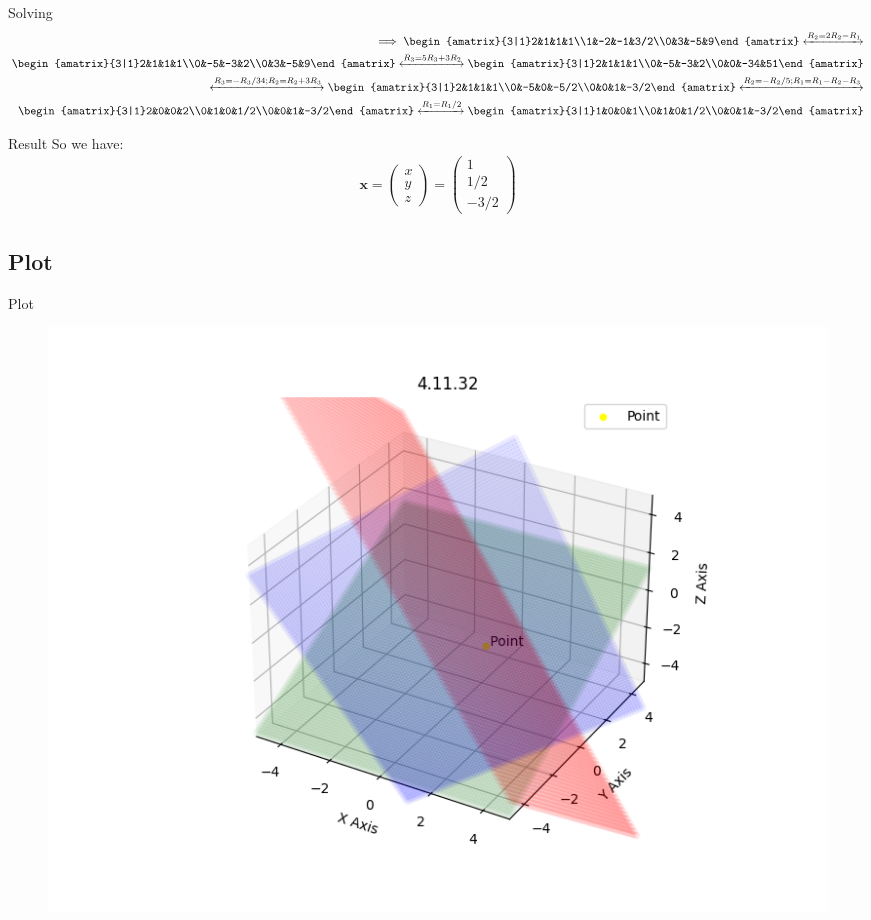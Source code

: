 \documentclass{beamer}
\theoremstyle{remark}
\newcommand{\myvec}[1]{\ensuremath{\begin{pmatrix}#1\end{pmatrix}}}
\newcommand{\augvec}[3]{\ensuremath{\begin{amatrix}{#1|#2}#3\end{amatrix}}}
\let\vec\mathbf
\numberwithin{equation}{section}
\begin{document}
\begin{frame}{Solving}
\begin{align}
 \implies \augvec{3}{1}{2&1&1&1\\1&-2&-1&3/2\\0&3&-5&9} \xleftrightarrow[]{R_2=2R_2-R_1} \\
 \augvec{3}{1}{2&1&1&1\\0&-5&-3&2\\0&3&-5&9} \xleftrightarrow[]{R_3=5R_3+3R_2}
 \augvec{3}{1}{2&1&1&1\\0&-5&-3&2\\0&0&-34&51} \\
 \xleftrightarrow[]{R_3=-R_3/34; R_2=R_2+3R_3}
 \augvec{3}{1}{2&1&1&1\\0&-5&0&-5/2\\0&0&1&-3/2} \xleftrightarrow[]{R_2=-R_2/5; R_1=R_1-R_2-R_3}\\
 \augvec{3}{1}{2&0&0&2\\0&1&0&1/2\\0&0&1&-3/2}
 \xleftrightarrow[]{R_1=R_1/2}
 \augvec{3}{1}{1&0&0&1\\0&1&0&1/2\\0&0&1&-3/2}
\end{align}
\end{frame}
\begin{frame}{Result}
 So we have:
\begin{align}
 \vec{x}=\myvec{x\\y\\z}=\myvec{1\\1/2\\-3/2}
\end{align}
\end{frame}
\subsection{Plot}
\begin{frame}{Plot}
 \begin{figure}[H]
    \centering
    \includegraphics[width=0.8\columnwidth]{../figs/plot.png}
    \caption*{}
    \label{fig:plot}
\end{figure}
\end{frame}
\end{document}
